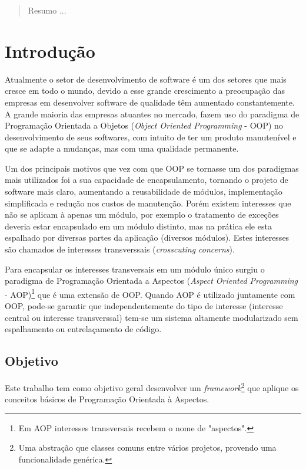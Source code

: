 \documentclass[tc,openright]{iiufrgs}
\begin{document}
\listoffigures

\listoftables

\begin{abstract}

Resumo ...

\end{abstract}

\chapter{Introdução}

Atualmente o setor de desenvolvimento de software é um dos setores que mais cresce em todo o mundo, devido a esse grande crescimento a preocupação das empresas em desenvolver software de qualidade têm aumentado constantemente. A grande maioria das empresas atuantes no mercado, fazem uso do paradigma de Programação Orientada a Objetos (\textit{Object Oriented Programming} - OOP) no desenvolvimento de seus softwares, com intuito de ter um produto manutenível e que se adapte a mudanças, mas com uma qualidade permanente.

Um dos principais motivos que vez com que OOP se tornasse um dos paradigmas mais utilizados foi a sua capacidade de encapsulamento, tornando o projeto de software mais claro, aumentando a reusabilidade de módulos, implementação simplificada e redução nos custos de manutenção. Porém existem interesses que não se aplicam à apenas um módulo, por exemplo o tratamento de exceções deveria estar encapsulado em um módulo distinto, mas na prática ele esta espalhado por diversas partes da aplicação (diversos módulos). Estes interesses são chamados de interesses transverssais (\textit{crosscuting concerns}).

Para encapsular os interesses transversais em um módulo único surgiu o paradigma de Programação Orientada a Aspectos (\textit{Aspect Oriented Programming} - AOP)\footnote{Em AOP interesses transversais recebem o nome de "aspectos".} que é uma extensão de OOP. Quando AOP é utilizado juntamente com OOP, pode-se garantir que independentemente do tipo de interesse (interesse central ou interesse transverssal) tem-se um sistema altamente modularizado sem espalhamento ou entrelaçamento de código.



\section{Objetivo}
Este trabalho tem como objetivo geral desenvolver um \textit{framework}\footnote{Uma abstração que classes comuns entre vários projetos, provendo uma funcionalidade genérica.} que aplique os conceitos básicos de Programação Orientada à Aspectos.
\end{document}
